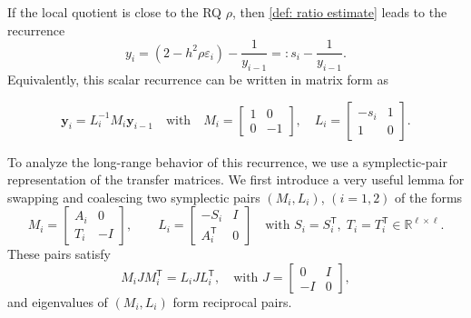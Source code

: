 \documentclass[11pt]{article}
\numberwithin{equation}{section}
\begin{document}
If the local quotient is close to the RQ $\rho$, then \eqref{def: ratio estimate} leads to the recurrence
\begin{equation} \label{def: iteration}
y_{i} = (2 - h^2\rho \varepsilon_i) - \frac{1}{y_{i-1}}
=: s_i - \frac{1}{y_{i-1}}.
\end{equation}
Equivalently, this scalar recurrence can be written in matrix form as

\begin{equation} \label{def: matrix iteration}
\boldsymbol{y}_i = L_i^{-1} M_i \boldsymbol{y}_{i-1} \quad \text{with} \quad
    M_i = \begin{bmatrix} 1 & 0 \\ 0 & -1 \end{bmatrix}, \quad
    L_i = \begin{bmatrix} -s_i & 1 \\ 1 & 0 \end{bmatrix}.
\end{equation}

To analyze the long-range behavior of this recurrence, we use a symplectic-pair representation of the transfer matrices. We first introduce a very useful lemma for swapping and coalescing two symplectic pairs $(M_i, L_i)$, $(i=1,2)$ of the forms
\begin{equation} \label{def: symplectic pairs}
M_i =
\begin{bmatrix}
A_i & 0 \\
T_i & -I
\end{bmatrix},
\qquad
L_i =
\begin{bmatrix}
- S_i & I \\
A_i^\mathsf{T} & 0
\end{bmatrix}
\quad \text{with } S_i = S_i^\mathsf{T},\; T_i = T_i^\mathsf{T} \in \mathbb{R}^{\ell \times \ell}.
\end{equation}
These pairs satisfy
\[
M_i J M_i^\mathsf{T} = L_i J L_i^\mathsf{T},
\quad \text{with }
J =
\begin{bmatrix}
0 & I \\
- I & 0
\end{bmatrix},
\]
and eigenvalues of $(M_i,L_i)$ form reciprocal pairs.
\end{document}
